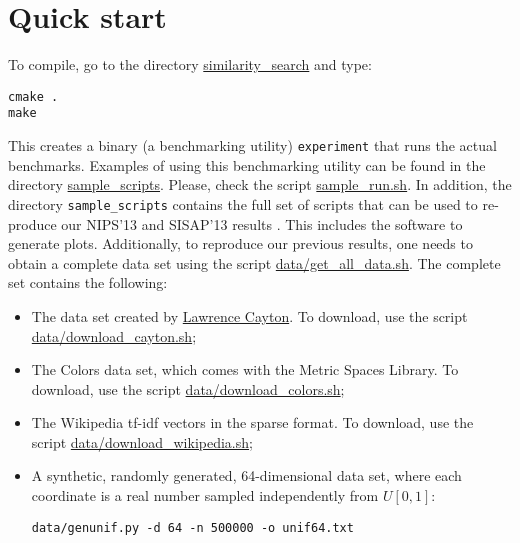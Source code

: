 \documentclass[runningheads,a4paper]{llncs}
\newcommand{\ttt}[1]{\texttt{#1}}
\begin{document}
{\section{Quick start}
To compile, go to the directory \href{https://github.com/searchivarius/NonMetricSpaceLib/tree/master/similarity_search}{similarity\_search} and type:  
\begin{verbatim}
cmake .  
make   
\end{verbatim}
This creates a binary (a benchmarking utility) \ttt{experiment} that runs the actual benchmarks. 
Examples of using this benchmarking utility can be found in the directory \href{https://github.com/searchivarius/NonMetricSpaceLib/tree/master/sample_scripts}{sample\_scripts}. 
Please, check the script \href{https://github.com/searchivarius/NonMetricSpaceLib/tree/master/sample_scripts/sample_run.sh}{sample\_run.sh}. 
In addition, the directory \ttt{sample\_scripts} contains the full set of scripts that can be used to re-produce our NIPS'13 and SISAP'13 results \cite{Boytsov_and_Bilegsaikhan:sisap2013,Boytsov_and_Bilegsaikhan:nips2013}.
This includes the software to generate plots. 
Additionally, to reproduce our previous results, one needs to obtain a complete data set using the script \href{https://github.com/searchivarius/NonMetricSpaceLib/tree/master/data/get_all_data.sh}{data/get\_all\_data.sh}. 
The complete set contains the following:

\begin{itemize} 
\item The data set created by \href{http://lcayton.com}{Lawrence Cayton}. 
To download, use the script 
\href{https://github.com/searchivarius/NonMetricSpaceLib/tree/master/data/download_cayton.sh}{data/download\_cayton.sh};
\item The Colors data set, which comes with the Metric Spaces Library\cite{LibMetricSpace}.
To download, use the script 
\href{https://github.com/searchivarius/NonMetricSpaceLib/tree/master/data/download_colors.sh}{data/download\_colors.sh};
\item The Wikipedia tf-idf vectors in the sparse format.
To download, use the script 
\href{https://github.com/searchivarius/NonMetricSpaceLib/tree/master/data/download_wikipedia.sh}{data/download\_wikipedia.sh};
\item A synthetic, randomly generated, 64-dimensional data set, where each coordinate is a real number sampled independently from $U[0,1]$:  

\ttt{data/genunif.py -d 64 -n 500000 -o unif64.txt}
\end{itemize}

}
\end{document}
